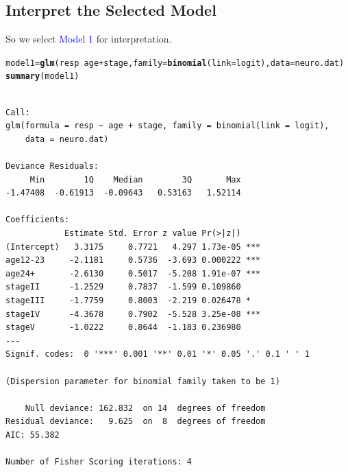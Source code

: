 \documentclass{article}\usepackage[]{graphicx}\usepackage[svgnames]{xcolor}
\makeatletter
\newcommand{\hlopt}[1]{\textcolor[rgb]{0,0,0}{#1}}%
\newcommand{\hlstd}[1]{\textcolor[rgb]{0.345,0.345,0.345}{#1}}%
\newcommand{\hlkwb}[1]{\textcolor[rgb]{0.69,0.353,0.396}{#1}}%
\newcommand{\hlkwc}[1]{\textcolor[rgb]{0.333,0.667,0.333}{#1}}%
\newcommand{\hlkwd}[1]{\textcolor[rgb]{0.737,0.353,0.396}{\textbf{#1}}}%
\newenvironment{kframe}{%
 \def\at@end@of@kframe{}%
 \ifinner\ifhmode%
  \def\at@end@of@kframe{\end{minipage}}%
  \begin{minipage}{\columnwidth}%
 \fi\fi%
 \def\FrameCommand##1{\hskip\@totalleftmargin \hskip-\fboxsep
 \colorbox{shadecolor}{##1}\hskip-\fboxsep
     \hskip-\linewidth \hskip-\@totalleftmargin \hskip\columnwidth}%
 \MakeFramed {\advance\hsize-\width
   \@totalleftmargin\z@ \linewidth\hsize
   \@setminipage}}%
 {\par\unskip\endMakeFramed%
 \at@end@of@kframe}
\newenvironment{knitrout}{}{} %
\makeatother
\begin{document}
\subsection*{Interpret the Selected Model}
So we select \textcolor{Blue}{Model 1} for interpretation.
\begin{knitrout}
\color{fgcolor}\begin{kframe}
\begin{alltt}
\hlstd{model1} \hlkwb{=} \hlkwd{glm}\hlstd{(resp} \hlopt{~} \hlstd{age} \hlopt{+} \hlstd{stage,} \hlkwc{family} \hlstd{=} \hlkwd{binomial}\hlstd{(}\hlkwc{link} \hlstd{= logit),} \hlkwc{data} \hlstd{= neuro.dat)}
\hlkwd{summary}\hlstd{(model1)}
\end{alltt}
\begin{verbatim}

Call:
glm(formula = resp ~ age + stage, family = binomial(link = logit), 
    data = neuro.dat)

Deviance Residuals: 
     Min        1Q    Median        3Q       Max  
-1.47408  -0.61913  -0.09643   0.53163   1.52114  

Coefficients:
            Estimate Std. Error z value Pr(>|z|)    
(Intercept)   3.3175     0.7721   4.297 1.73e-05 ***
age12-23     -2.1181     0.5736  -3.693 0.000222 ***
age24+       -2.6130     0.5017  -5.208 1.91e-07 ***
stageII      -1.2529     0.7837  -1.599 0.109860    
stageIII     -1.7759     0.8003  -2.219 0.026478 *  
stageIV      -4.3678     0.7902  -5.528 3.25e-08 ***
stageV       -1.0222     0.8644  -1.183 0.236980    
---
Signif. codes:  0 '***' 0.001 '**' 0.01 '*' 0.05 '.' 0.1 ' ' 1

(Dispersion parameter for binomial family taken to be 1)

    Null deviance: 162.832  on 14  degrees of freedom
Residual deviance:   9.625  on  8  degrees of freedom
AIC: 55.382

Number of Fisher Scoring iterations: 4
\end{verbatim}
\end{kframe}
\end{knitrout}
\end{document}
